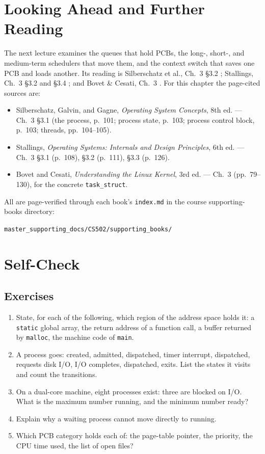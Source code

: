 \documentclass[11pt]{article}
\begin{document}
\section{Looking Ahead and Further Reading}

The next lecture examines the queues that hold PCBs, the long-, short-, and
medium-term schedulers that move them, and the context switch that saves one
PCB and loads another. Its reading is Silberschatz et al., Ch.~3 \S3.2
\cite{SilberschatzOSC_operating_system_concepts}; Stallings, Ch.~3 \S3.2 and
\S3.4 \cite{StallingsOS_internals_design_principles}; and Bovet \& Cesati,
Ch.~3 \cite{BovetCesati_understanding_linux_kernel}. For this chapter the
page-cited sources are:
\begin{itemize}
  \item Silberschatz, Galvin, and Gagne, \emph{Operating System Concepts}, 8th
        ed. --- Ch.~3 \S3.1 (the process, p.~101; process state, p.~103;
        process control block, p.~103; threads, pp.~104--105).
  \item Stallings, \emph{Operating Systems: Internals and Design Principles},
        6th ed. --- Ch.~3 \S3.1 (p.~108), \S3.2 (p.~111), \S3.3 (p.~126).
  \item Bovet and Cesati, \emph{Understanding the Linux Kernel}, 3rd ed. ---
        Ch.~3 (pp.~79--130), for the concrete \texttt{task\_struct}.
\end{itemize}
All are page-verified through each book's \texttt{index.md} in the course supporting-books directory:
\begin{center}\texttt{master\_supporting\_docs/CS502/supporting\_books/}\end{center}

\section*{Self-Check}

\subsection*{Exercises}
\begin{enumerate}
  \item State, for each of the following, which region of the address space
        holds it: a \texttt{static} global array, the return address of a
        function call, a buffer returned by \texttt{malloc}, the machine code of
        \texttt{main}.
  \item A process goes: created, admitted, dispatched, timer interrupt,
        dispatched, requests disk I/O, I/O completes, dispatched, exits. List
        the states it visits and count the transitions.
  \item On a dual-core machine, eight processes exist: three are blocked on
        I/O. What is the maximum number running, and the minimum number ready?
  \item Explain why a waiting process cannot move directly to running.
  \item Which PCB category holds each of: the page-table pointer, the priority,
        the CPU time used, the list of open files?
\end{enumerate}
\end{document}
